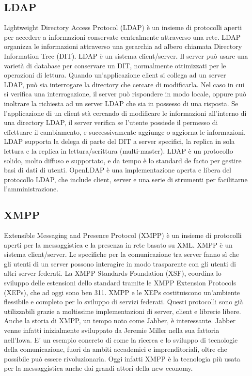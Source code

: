 \subsection{LDAP}
Lightweight Directory Access Protocol (LDAP) è un insieme di
protocolli aperti per accedere a informazioni conservate centralmente
attraverso una rete. LDAP organizza le informazioni attraverso una
gerarchia ad albero chiamata Directory Information Tree (DIT). LDAP è
un sistema client/server. Il server può usare una varietà di database
per conservare un DIT, normalmente ottimizzati per le operazioni di
lettura. Quando un'applicazione client si collega ad un server LDAP,
può sia interrogare la directory che cercare di modificarla. Nel caso
in cui si verifica una interrogazione, il server può rispondere in
modo locale, oppure può inoltrare la richiesta ad un server LDAP che
sia in possesso di una risposta. Se l'applicazione di un client stà
cercando di modificare le informazioni all'interno di una directory
LDAP, il server verifica se l'utente possiede il permesso di
effettuare il cambiamento, e successivamente aggiunge o aggiorna le
informazioni. LDAP supporta la delega di parte del DIT a server
specifici, la replica in sola lettura e la replica in
lettura/scrittura (multi-master).  LDAP è un protocollo solido, molto
diffuso e supportato, e da tempo è lo standard de facto per gestire
basi di dati di utenti. OpenLDAP è una implementazione aperta e libera
del protocollo LDAP, che include client, server e una serie di
strumenti per facilitarne l'amministrazione.

\subsection{XMPP}
Extensible Messaging and Presence Protocol (XMPP) è un insieme di
protocolli aperti per la messaggistica e la presenza in rete basato su
XML. XMPP è un sistema client/server. Le specifiche per la
comunicazione tra server fanno sì che gli utenti di un server possono
interagire in modo trasparente con gli utenti di altri server
federati. La XMPP Standards Foundation (XSF), coordina lo sviluppo
delle estensioni dello standard tramite le XMPP Extension Protocols
(XEPs), che ad oggi sono ben 311. XMPP e le XEPs costituiscono
un'ambiente flessibile e completo per lo sviluppo di servizi
federati. Questi protocolli sono già utilizzabili grazie a moltissime
implementazioni di server, client e librerie libere. Anche la storia
di XMPP, un tempo noto come Jabber, è interessante. Jabber venne
infatti inizialmente sviluppato da Jeremie Miller nella sua fattoria
nell'Iowa. E' un esempio concreto di come la ricerca e lo sviluppo di
tecnologie della comunicazione, fuori da ambiti accademici e
imprenditoriali, oltre che possibile può essere rivoluzionaria. Oggi
infatti XMPP è la tecnologia più usata per la messaggistica anche dai
grandi attori della new economy.

